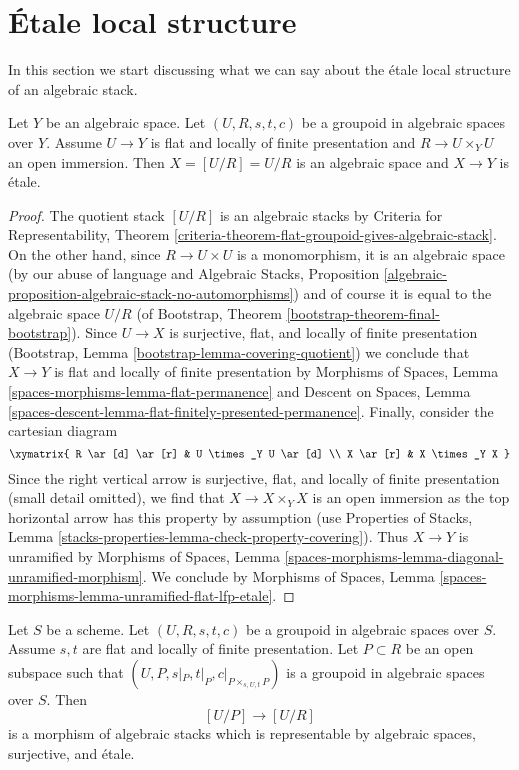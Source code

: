 \section{\'Etale local structure}
\label{section-etale-local}

\noindent
In this section we start discussing what we can say
about the \'etale local structure of an algebraic stack.

\begin{lemma}
\label{lemma-quotient-etale}
Let $Y$ be an algebraic space.
Let $(U, R, s, t, c)$ be a groupoid in algebraic spaces over $Y$.
Assume $U \to Y$ is flat and locally of finite presentation
and $R \to U \times_Y U$ an open immersion.
Then $X = [U/R] = U/R$ is an algebraic space and $X \to Y$
is \'etale.
\end{lemma}

\begin{proof}
The quotient stack $[U/R]$ is an algebraic stacks by
Criteria for Representability, Theorem
\ref{criteria-theorem-flat-groupoid-gives-algebraic-stack}.
On the other hand, since $R \to U \times U$ is a monomorphism,
it is an algebraic space (by our abuse of language and
Algebraic Stacks, Proposition
\ref{algebraic-proposition-algebraic-stack-no-automorphisms})
and of course it is equal to the algebraic space $U/R$
(of Bootstrap, Theorem \ref{bootstrap-theorem-final-bootstrap}).
Since $U \to X$ is surjective, flat, and locally of finite presentation
(Bootstrap, Lemma \ref{bootstrap-lemma-covering-quotient})
we conclude that $X \to Y$ is flat and locally of finite presentation by
Morphisms of Spaces, Lemma \ref{spaces-morphisms-lemma-flat-permanence}
and
Descent on Spaces, Lemma
\ref{spaces-descent-lemma-flat-finitely-presented-permanence}.
Finally, consider the cartesian diagram
$$
\xymatrix{
R \ar[d] \ar[r] & U \times_Y U \ar[d] \\
X \ar[r] & X \times_Y X
}
$$
Since the right vertical arrow is surjective, flat, and
locally of finite presentation (small detail omitted), we
find that $X \to X \times_Y X$ is an open immersion as the top horizontal arrow
has this property by assumption (use
Properties of Stacks, Lemma
\ref{stacks-properties-lemma-check-property-covering}).
Thus $X \to Y$ is unramified by
Morphisms of Spaces, Lemma
\ref{spaces-morphisms-lemma-diagonal-unramified-morphism}.
We conclude by
Morphisms of Spaces, Lemma
\ref{spaces-morphisms-lemma-unramified-flat-lfp-etale}.
\end{proof}

\begin{lemma}
\label{lemma-quasi-splitting-etale}
Let $S$ be a scheme.
Let $(U, R, s, t, c)$ be a groupoid in algebraic spaces over $S$.
Assume $s, t$ are flat and locally of finite presentation.
Let $P \subset R$ be an open subspace such that
$(U, P, s|_P, t|_P, c|_{P \times_{s, U, t} P})$ is a
groupoid in algebraic spaces over $S$. Then
$$
[U/P] \longrightarrow [U/R]
$$
is a morphism of algebraic stacks which
is representable by algebraic spaces, surjective, and \'etale.
\end{lemma}

